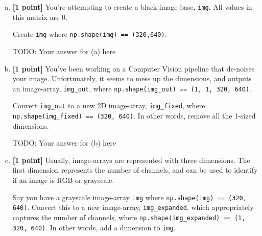 \begin{enumerate}[(a)]
    \item \textbf{[1 point]} You're attempting to create a black image base, \texttt{img}. All values in this matrix are 0. 
    
    \begin{tcolorbox}[colback=orange!5!white,colframe=orange!75!black]
    Create \texttt{img} where \texttt{np.shape(img) == (320,640)}.
    \end{tcolorbox}
    
    \begin{tcolorbox}[colback=white!5!white,colframe=green!75!black]
    \begin{mdframed}
        TODO: Your answer for (a) here
    \end{mdframed}
\end{tcolorbox}
    
    \item \textbf{[1 point]} You've been working on a Computer Vision pipeline that de-noises your image. Unfortunately, it seems to mess up the dimensions, and outputs an image-array, \texttt{img\_out}, where \texttt{np.shape(img\_out) == (1, 1, 320, 640)}. 
    
    \begin{tcolorbox}[colback=orange!5!white,colframe=orange!75!black]
    Convert \texttt{img\_out} to a new 2D image-array, \texttt{img\_fixed}, where \texttt{np.shape(img\_fixed) == (320, 640)}. In other words, remove all the 1-sized dimensions.
    \end{tcolorbox}

\begin{tcolorbox}[colback=white!5!white,colframe=green!75!black]
    \begin{mdframed}
        TODO: Your answer for (b) here
    \end{mdframed}
\end{tcolorbox}
    
    \item \textbf{[1 point]} Usually, image-arrays are represented with three dimensions. The first dimension represents the number of channels, and can be used to identify if an image is RGB or grayscale. 
    
    \begin{tcolorbox}[colback=orange!5!white,colframe=orange!75!black]
    Say you have a grayscale image-array \texttt{img} where \texttt{np.shape(img) == (320, 640)}. Convert this to a new image-array, \texttt{img\_expanded}, which appropriately captures the number of channels, where \texttt{np.shape(img\_expanded) == (1, 320, 640)}. In other words, add a dimension to \texttt{img}.
    \end{tcolorbox}


\end{enumerate}
